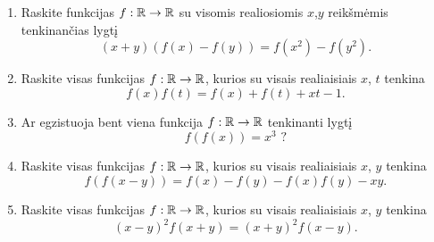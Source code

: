 \begin{enumerate}
  \item {} Raskite funkcijas $f:\mathbb R\to\mathbb R$ su visomis realiosiomis
    $x$,$y$ reikšmėmis tenkinančias lygtį
    $$(x+y)(f(x)-f(y))=f(x^2)-f(y^2).$$
  \item Raskite visas funkcijas $f:\mathbb R\to\mathbb R$, kurios su visais realiaisiais
    $x$, $t$ tenkina $$f(x)f(t) = f(x) + f(t) + xt -1.$$
  \item \text{[LitMo 1994]} Ar egzistuoja bent viena funkcija $f:\mathbb R \to \mathbb R$
    tenkinanti lygtį $$f(f(x))=x^3 \text{ ?}$$
  \item Raskite visas funkcijas $f:\mathbb R\to\mathbb R$, kurios su visais realiaisiais
    $x$, $y$ tenkina $$f(f(x-y)) = f(x) - f(y) - f(x)f(y) - xy.$$
  \item Raskite visas funkcijas $f:\mathbb R\to\mathbb R$, kurios su visais realiaisiais
    $x$, $y$ tenkina $$(x-y)^2f(x+y)=(x+y)^2f(x-y).$$


\end{enumerate}
